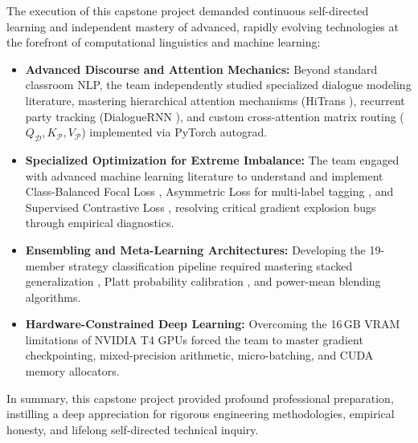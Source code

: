 The execution of this capstone project demanded continuous self-directed learning and independent mastery of advanced, rapidly evolving technologies at the forefront of computational linguistics and machine learning:
\begin{itemize}
  \item \textbf{Advanced Discourse and Attention Mechanics:} Beyond standard classroom NLP, the team independently studied specialized dialogue modeling literature, mastering hierarchical attention mechanisms (HiTrans \cite{li2020hitrans}), recurrent party tracking (DialogueRNN \cite{majumder2019dialoguernn}), and custom cross-attention matrix routing ($Q_{\mathcal{D}}, K_{\mathcal{P}}, V_{\mathcal{P}}$) implemented via PyTorch autograd.
  \item \textbf{Specialized Optimization for Extreme Imbalance:} The team engaged with advanced machine learning literature to understand and implement Class-Balanced Focal Loss \cite{cui2019class}, Asymmetric Loss for multi-label tagging \cite{benbaruch2021asymmetric}, and Supervised Contrastive Loss \cite{khosla2020supervised}, resolving critical gradient explosion bugs through empirical diagnostics.
  \item \textbf{Ensembling and Meta-Learning Architectures:} Developing the 19-member strategy classification pipeline required mastering stacked generalization \cite{wolpert1992stacked}, Platt probability calibration \cite{platt1999probabilistic}, and power-mean blending algorithms.
  \item \textbf{Hardware-Constrained Deep Learning:} Overcoming the 16\,GB VRAM limitations of NVIDIA T4 GPUs forced the team to master gradient checkpointing, mixed-precision arithmetic, micro-batching, and CUDA memory allocators.\end{itemize}
In summary, this capstone project provided profound professional preparation, instilling a deep appreciation for rigorous engineering methodologies, empirical honesty, and lifelong self-directed technical inquiry.

